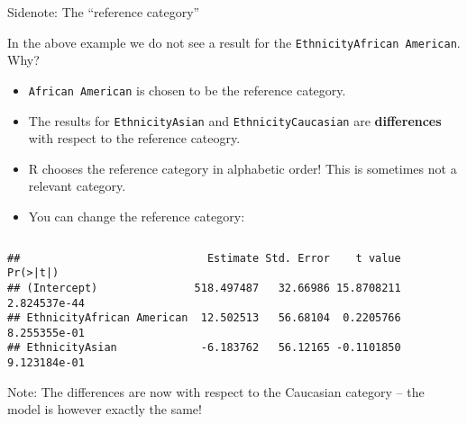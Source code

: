 \documentclass[10pt,ignorenonframetext,]{beamer}
\newenvironment{Shaded}{\begin{snugshade}}{\end{snugshade}}
\newcommand{\DataTypeTok}[1]{\textcolor[rgb]{0.13,0.29,0.53}{#1}}
\newcommand{\KeywordTok}[1]{\textcolor[rgb]{0.13,0.29,0.53}{\textbf{#1}}}
\newcommand{\NormalTok}[1]{#1}
\newcommand{\OperatorTok}[1]{\textcolor[rgb]{0.81,0.36,0.00}{\textbf{#1}}}
\newcommand{\StringTok}[1]{\textcolor[rgb]{0.31,0.60,0.02}{#1}}
\providecommand{\tightlist}{%
  \setlength{\itemsep}{0pt}\setlength{\parskip}{0pt}}
\begin{document}
\begin{frame}[fragile]

\begin{block}{Sidenote: The ``reference category''}

\vspace{2mm}

In the above example we do not see a result for the
\texttt{EthnicityAfrican\ American}. Why?

\begin{itemize}
\tightlist
\item
  \texttt{African\ American} is chosen to be the reference category.
\item
  The results for \texttt{EthnicityAsian} and
  \texttt{EthnicityCaucasian} are \textbf{differences} with respect to
  the reference cateogry.
\item
  R chooses the reference category in alphabetic order! This is
  sometimes not a relevant category.
\item
  You can change the reference category:
\end{itemize}

\(~\)

\scriptsize

\begin{Shaded}
\end{Shaded}

\begin{verbatim}
##                             Estimate Std. Error    t value     Pr(>|t|)
## (Intercept)               518.497487   32.66986 15.8708211 2.824537e-44
## EthnicityAfrican American  12.502513   56.68104  0.2205766 8.255355e-01
## EthnicityAsian             -6.183762   56.12165 -0.1101850 9.123184e-01
\end{verbatim}

\vspace{2mm}

\small

Note: The differences are now with respect to the Caucasian category --
the model is however exactly the same!

\end{block}

\end{frame}
\end{document}
